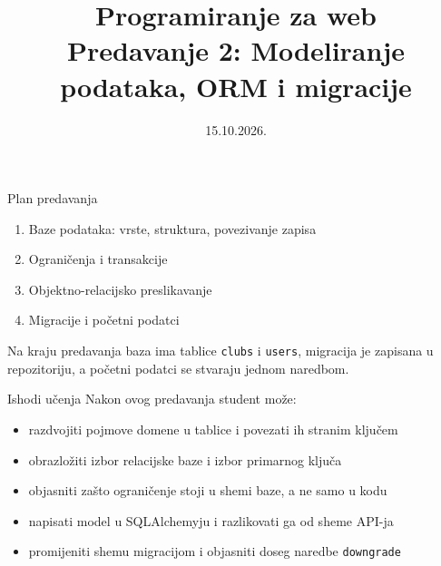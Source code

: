 

\title[Predavanje 2: Modeliranje podataka]{Programiranje za web \\ Predavanje 2: Modeliranje podataka, ORM i migracije}
\date{15.10.2026.}



\frame{\titlepage}

\begin{frame}{Plan predavanja}
\begin{enumerate}
  \item Baze podataka: vrste, struktura, povezivanje zapisa
  \item Ograničenja i transakcije
  \item Objektno-relacijsko preslikavanje
  \item Migracije i početni podatci
\end{enumerate}

\vspace{0.6em}
Na kraju predavanja baza ima tablice \texttt{clubs} i \texttt{users}, migracija je zapisana u repozitoriju, a početni podatci se stvaraju jednom naredbom.
\end{frame}

\begin{frame}{Ishodi učenja}
Nakon ovog predavanja student može:

\begin{itemize}
  \item razdvojiti pojmove domene u tablice i povezati ih stranim ključem
  \item obrazložiti izbor relacijske baze i izbor primarnog ključa
  \item objasniti zašto ograničenje stoji u shemi baze, a ne samo u kodu
  \item napisati model u SQLAlchemyju i razlikovati ga od sheme API-ja
  \item promijeniti shemu migracijom i objasniti doseg naredbe \texttt{downgrade}
\end{itemize}
\end{frame}


